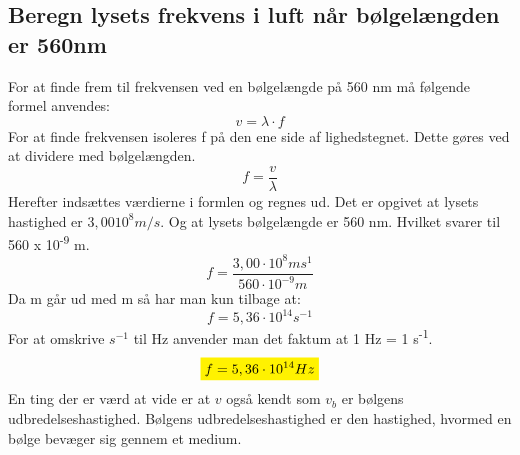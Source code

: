 \subsection{Beregn lysets frekvens i luft når bølgelængden er 560nm}
For at finde frem til frekvensen ved en bølgelængde på 560 nm må følgende formel anvendes:
\begin{equation*}
    v=\lambda \cdot f
\end{equation*}
For at finde frekvensen isoleres f på den ene side af lighedstegnet. Dette gøres ved at dividere med bølgelængden.
\begin{equation*}
    f=\frac{v}{\lambda}
\end{equation*}
Herefter indsættes værdierne i formlen og regnes ud. Det er opgivet at lysets hastighed er \begin{math}3,00 10^{8} m/s\end{math}. Og at lysets bølgelængde er 560 nm. Hvilket svarer til 560 x 10\textsuperscript{-9} m.
\begin{equation*}
    f=\frac{3,00 \cdot 10^{8} m s^{1}}{560 \cdot 10^{-9} m}
\end{equation*}
Da m går ud med m så har man kun tilbage at:
\begin{equation*}
    f=5,36 \cdot 10^{14} s^{-1}
\end{equation*}
For at omskrive \begin{math}s^{-1}\end{math} til Hz anvender man det faktum at 1 Hz = 1 s\textsuperscript{-1}.
\textbf{\begin{equation*}
    \mathcolorbox{yellow}{f=5,36 \cdot 10^{14} Hz}
\end{equation*}}
En ting der er værd at vide er at \begin{math}v\end{math} også kendt som \begin{math}v_b\end{math} er bølgens udbredelseshastighed. Bølgens udbredelseshastighed er den hastighed, hvormed en bølge bevæger sig gennem et medium. 
